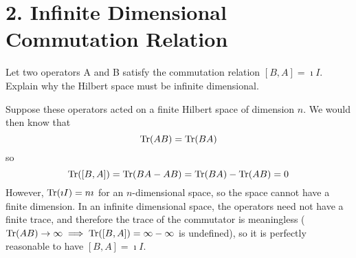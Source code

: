 \documentclass[a4paper,twoside]{article}
\begin{document}
\section*{2. Infinite Dimensional Commutation Relation}
Let two operators A and B satisfy the commutation relation $ [B,A] = \imath I $. Explain why the Hilbert space must be infinite dimensional.
\begin{tcolorbox}[breakable]
    Suppose these operators acted on a finite Hilbert space of dimension $ n $. We would then know that
    \begin{equation}
        \Tr (AB) = \Tr (BA)
    \end{equation}
    so
    \begin{equation}
        \Tr ([B,A]) = \Tr (BA-AB) = \Tr (BA) - \Tr (AB) = 0
    \end{equation}
    However, $ \Tr (\imath I) = n\imath $ for an $ n $-dimensional space, so the space cannot have a finite dimension. In an infinite dimensional space, the operators need not have a finite trace, and therefore the trace of the commutator is meaningless ($ \Tr (AB) \to \infty \implies \Tr ([B,A]) = \infty - \infty $ is undefined), so it is perfectly reasonable to have $ [B,A] = \imath I $.
\end{tcolorbox}
\end{document}
